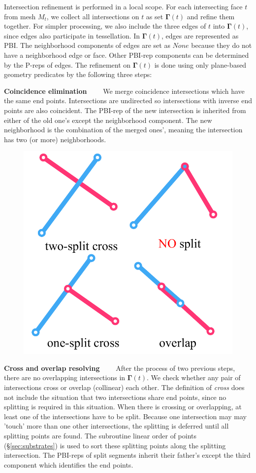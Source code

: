 \documentclass[10pt,journal,compsoc]{IEEEtran}
\begin{document}
Intersection refinement is performed in a local scope. For each intersecting face $t$ from mesh $M_t$, we collect all intersections on $t$ as set $\bm{\Gamma}(t)$
and refine them together. For simpler processing, we also include the three edges of $t$ into $\bm{\Gamma}(t)$, since edges also participate in tessellation. In $\bm{\Gamma}(t)$, edges are represented as PBI. The neighborhood components of edges are set as $None$ because they do not have a neighborhood edge or face. Other PBI-rep components can be determined by the P-reps of edges. The refinement on $\bm{\Gamma}(t)$ is done using only plane-based geometry predicates by the following three steps:

\vspace{0.5em}
\noindent \textbf{Coincidence elimination}~~~~
We merge coincidence intersections which have the same end points. Intersections are undirected so intersections with inverse end points are also coincident. The PBI-rep of the new intersection is inherited from either of the old one's except the neighborhood component. The new neighborhood is the combination of the merged ones', meaning the intersection has two (or more) neighborhoods.

\begin{figure}
\includegraphics[width=1.7 in]{resolve}
\end{figure}
\vspace{0.5em}
\noindent \textbf{Cross and overlap resolving}~~~~
After the process of two previous steps, there are no overlapping intersections in $\bm{\Gamma}(t)$. We check whether any pair of intersections cross or overlap (collinear) each other. The definition of \emph{cross} does not include the situation that two intersections share end points, since no splitting is required in this situation. When there is crossing or overlapping, at least one of the intersections have to be split. Because one intersection may may 'touch' more than one other intersections, the splitting is deferred until all splitting points are found. The subroutine linear order of points (\S\ref{sec:substrates}) is used to sort these splitting points along the splitting intersection. The PBI-reps of split segments inherit their father's except the third component which identifies the end points.
\end{document}
